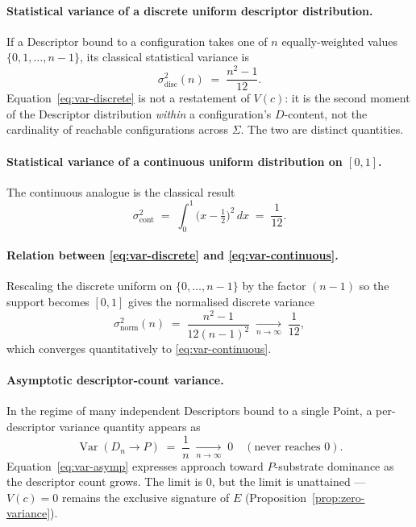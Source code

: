 \documentclass[11pt,a4paper]{article}
\theoremstyle{definition}
\theoremstyle{remark}
\begin{document}
\paragraph{Statistical variance of a discrete uniform descriptor distribution.}
If a Descriptor bound to a configuration takes one of $n$ equally-weighted values $\{0,1,\ldots,n-1\}$, its classical statistical variance is
\begin{equation}\label{eq:var-discrete}
\sigma^{2}_{\text{disc}}(n) \;=\; \frac{n^{2}-1}{12}.
\end{equation}
Equation~\eqref{eq:var-discrete} is not a restatement of $V(c)$: it is the second moment of the Descriptor distribution \emph{within} a configuration's $D$-content, not the cardinality of reachable configurations across $\Sigma$. The two are distinct quantities.

\paragraph{Statistical variance of a continuous uniform distribution on $[0,1]$.}
The continuous analogue is the classical result
\begin{equation}\label{eq:var-continuous}
\sigma^{2}_{\text{cont}} \;=\; \int_{0}^{1}\!\bigl(x-\tfrac{1}{2}\bigr)^{2}\,dx \;=\; \frac{1}{12}.
\end{equation}

\paragraph{Relation between \eqref{eq:var-discrete} and \eqref{eq:var-continuous}.}
Rescaling the discrete uniform on $\{0,\ldots,n-1\}$ by the factor $(n-1)$ so the support becomes $[0,1]$ gives the normalised discrete variance
\begin{equation}\label{eq:var-norm}
\sigma^{2}_{\text{norm}}(n) \;=\; \frac{n^{2}-1}{12(n-1)^{2}} \;\xrightarrow[n\to\infty]{}\; \frac{1}{12},
\end{equation}
which converges quantitatively to \eqref{eq:var-continuous}.

\paragraph{Asymptotic descriptor-count variance.}
In the regime of many independent Descriptors bound to a single Point, a per-descriptor variance quantity appears as
\begin{equation}\label{eq:var-asymp}
\operatorname{Var}(D_{n}\to P) \;=\; \frac{1}{n} \;\xrightarrow[n\to\infty]{}\; 0 \quad (\text{never reaches } 0).
\end{equation}
Equation~\eqref{eq:var-asymp} expresses approach toward $P$-substrate dominance as the descriptor count grows. The limit is $0$, but the limit is unattained --- $V(c)=0$ remains the exclusive signature of $E$ (Proposition~\ref{prop:zero-variance}).
\end{document}
